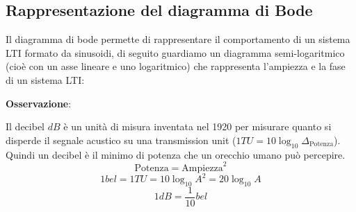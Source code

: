 \documentclass[a4paper]{article}
\begin{document}
\subsection{Rappresentazione del diagramma di Bode}
Il diagramma di bode permette di rappresentare il comportamento di un sistema LTI formato 
da sinusoidi, di seguito guardiamo un diagramma semi-logaritmico 
(cioè con un asse lineare e uno logaritmico) che rappresenta l'ampiezza e la fase di un
sistema LTI:

\vspace{1em}
\noindent
\textbf{Osservazione}:

\noindent
  Il decibel \( dB \) è un unità di misura inventata nel 1920 per misurare quanto si
  disperde il segnale acustico su una transmission unit (\( 1TU = 10 \log_{10} \Delta_{\text{Potenza}} \)).
  Quindi un decibel è il minimo di potenza che un orecchio umano può percepire.
  \[
    \text{Potenza} = \text{Ampiezza}^2
  \] 
  \[
    1 bel = 1 TU = 10\log_{10} A^2 = 20 \log_{10} A
  \] 
  \[
    1 dB = \frac{1}{10} bel
  \] 
\end{document}

